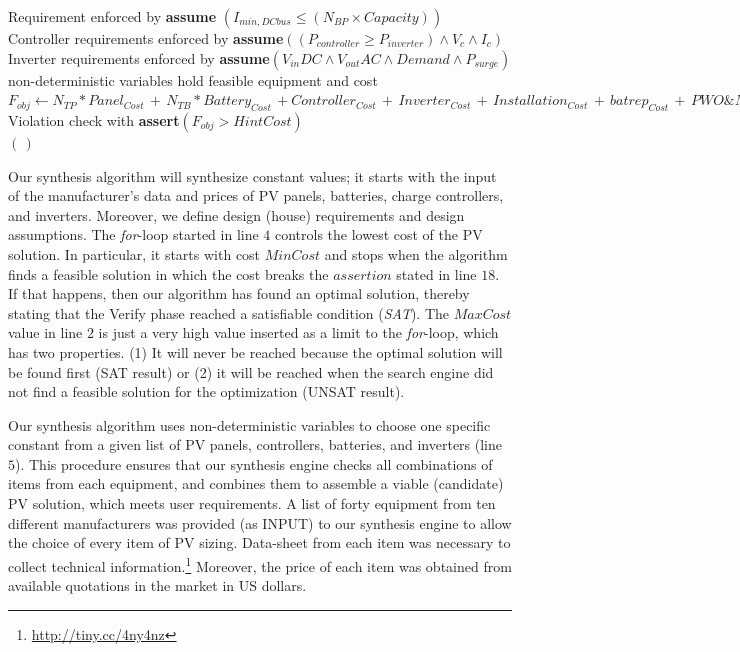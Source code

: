 \documentclass[journal]{IEEEtran}
\begin{document}
\begin{algorithm}
\begin{algorithmic}[1]
\begin{scriptsize}
	\STATE Requirement enforced by \textbf{assume} $(I_{min,DCbus} \leq (N_{BP} \times Capacity))$ \\
 	\STATE Controller requirements enforced by \textbf{assume}$((P_{controller} \geq P_{inverter}) \wedge V_{c} \wedge I_{c})$ \\
	\STATE Inverter requirements enforced by \textbf{assume}$(V_{in}DC \wedge V_{out}AC \wedge Demand \wedge P_{surge})$ \\
	\STATE non-deterministic variables hold feasible equipment and cost \\
	\STATE $F_{obj} \leftarrow N_{TP}*Panel_{Cost} \, + \, N_{TB}*Battery_{Cost} \, + Controller_{Cost} \, + \, Inverter_{Cost} \, + \, Installation_{Cost} \, + \, batrep_{Cost} \, + \, PWO\&M_{Cost}$ \\
	\STATE Violation check with \textbf{assert}$(F_{obj} > HintCost)$ \\
 \ENDFOR
 \RETURN $(\,)$ 
 \end{scriptsize}
 \end{algorithmic} 
 \label{alg:verification-algorithm}
 \end{algorithm}

Our synthesis algorithm will synthesize constant values; it starts with the input of the manufacturer's data and prices of PV panels, batteries, charge controllers, and inverters. Moreover, we define design (house) requirements and design assumptions. 
%
The \textit{for}-loop started in line $4$ controls the lowest cost of the PV solution. In particular, it starts with cost $MinCost$ and stops when the algorithm finds a feasible solution in which the cost breaks the $assertion$ stated in line $18$. If that happens, then our algorithm has found an optimal solution, thereby stating that the {\sc Verify} phase reached a satisfiable condition (\textit{SAT}). The $MaxCost$ value in line $2$ is just a very high value inserted as a limit to the \textit{for}-loop, which has two properties. (1) It will never be reached because the optimal solution will be found first (SAT result) or (2) it will be reached when the search engine did not find a feasible solution for the optimization (UNSAT result).

Our synthesis algorithm uses non-deterministic variables to choose one specific constant from a given list of PV panels, controllers, batteries, and inverters (line $5$). This procedure ensures that our synthesis engine checks all combinations of items from each equipment, and combines them to assemble a viable (candidate) PV solution, which meets user requirements. A list of forty equipment from ten different manufacturers was provided (as INPUT) to our synthesis engine to allow the choice of every item of PV sizing. Data-sheet from each item was necessary to collect technical information.\footnote{\url{http://tiny.cc/4ny4nz}} Moreover, the price of each item was obtained from available quotations in the market in US dollars. %
\end{document}
